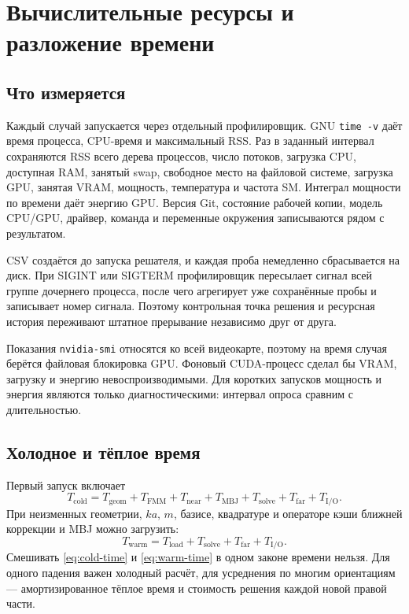 \documentclass[12pt,a4paper]{article}
\begin{document}
\section{Вычислительные ресурсы и разложение времени}

\subsection{Что измеряется}

Каждый случай запускается через отдельный профилировщик. GNU \texttt{time -v}
даёт время процесса, CPU-время и максимальный RSS. Раз в заданный интервал
сохраняются RSS всего дерева процессов, число потоков, загрузка CPU, доступная
RAM, занятый swap, свободное место на файловой системе, загрузка GPU, занятая
VRAM, мощность, температура и частота SM. Интеграл мощности по времени даёт
энергию GPU. Версия Git, состояние рабочей копии, модель CPU/GPU, драйвер,
команда и переменные окружения записываются рядом с результатом.

CSV создаётся до запуска решателя, и каждая проба немедленно сбрасывается на
диск. При SIGINT или SIGTERM профилировщик пересылает сигнал всей группе
дочернего процесса, после чего агрегирует уже сохранённые пробы и записывает
номер сигнала. Поэтому контрольная точка решения и ресурсная история переживают
штатное прерывание независимо друг от друга.

Показания \texttt{nvidia-smi} относятся ко всей видеокарте, поэтому на время
случая берётся файловая блокировка GPU. Фоновый CUDA-процесс сделал бы VRAM,
загрузку и энергию невоспроизводимыми. Для коротких запусков мощность и энергия
являются только диагностическими: интервал опроса сравним с длительностью.

\subsection{Холодное и тёплое время}

Первый запуск включает
\begin{equation}
  T_{\mathrm{cold}}=T_{\mathrm{geom}}+T_{\mathrm{FMM}}+
  T_{\mathrm{near}}+T_{\mathrm{MBJ}}+T_{\mathrm{solve}}+
  T_{\mathrm{far}}+T_{\mathrm{I/O}}.
  \label{eq:cold-time}
\end{equation}
При неизменных геометрии, $ka$, $m$, базисе, квадратуре и операторе кэши
ближней коррекции и MBJ можно загрузить:
\begin{equation}
  T_{\mathrm{warm}}=T_{\mathrm{load}}+T_{\mathrm{solve}}+
  T_{\mathrm{far}}+T_{\mathrm{I/O}}.
  \label{eq:warm-time}
\end{equation}
Смешивать \eqref{eq:cold-time} и \eqref{eq:warm-time} в одном законе времени
нельзя. Для одного падения важен холодный расчёт, для усреднения по многим
ориентациям --- амортизированное тёплое время и стоимость решения каждой новой
правой части.
\end{document}
